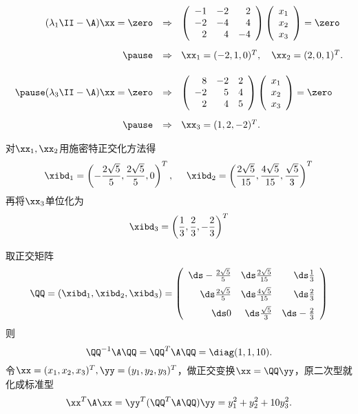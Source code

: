 \begin{frame}
  \begin{footnotesize}
    $$
    \begin{array}{rl}
      (\lambda_1\II-\A)\xx=\zero & \Rightarrow~~
      \left(
      \begin{array}{rrr}
        -1&-2&2\\
        -2&-4&4\\
        2&4&-4
      \end{array}
      \right)\left(
      \begin{array}{c}
        x_1\\
        x_2\\
        x_3
      \end{array}
      \right)=\zero\\[0.3in] \pause
      & \Rightarrow~~
      \xx_1=(-2,1,0)^T, \quad
      \xx_2=(2,0,1)^T. \\[0.2in]\pause
      (\lambda_3\II-\A)\xx=\zero & \Rightarrow~~
      \left(
      \begin{array}{rrr}
        8&-2&2\\
        -2&5&4\\
        2&4&5
      \end{array}
      \right)\left(
      \begin{array}{c}
        x_1\\
        x_2\\
        x_3
      \end{array}
      \right)=\zero\\[0.3in] \pause
      & \Rightarrow~~
      \xx_3=(1,2,-2)^T.
    \end{array}
    $$

    对$\xx_1,\xx_2$用施密特正交化方法得
    $$
    \xibd_1=\left(-\frac{2\sqrt{5}}5,\frac{2\sqrt{5}}5,0\right)^T,~~~~
    \xibd_2=\left(\frac{2\sqrt{5}}{15},\frac{4\sqrt{5}}{15},\frac{\sqrt{5}}3\right)^T
    $$
    再将$\xx_3$单位化为
    $$
    \xibd_3=\left(\frac13,\frac23,-\frac23\right)^T
    $$
  \end{footnotesize}
\end{frame}


\begin{frame}
  \begin{footnotesize}
    取正交矩阵
    $$
    \QQ=(\xibd_1,\xibd_2,\xibd_3)=\left(
    \begin{array}{rrr}
      \ds-\frac{2\sqrt{5}}5&\ds\frac{2\sqrt{5}}{15}&\ds\frac13\\[0.2cm]
      \ds \frac{2\sqrt{5}}5&\ds\frac{4\sqrt{5}}{15}&\ds\frac23\\[0.2cm]
      \ds 0&\ds\frac{\sqrt{5}}3&\ds-\frac23
    \end{array}
    \right)
    $$
    则
    $$
    \QQ^{-1}\A\QQ=\QQ^{T}\A\QQ=\diag(1,1,10).
    $$ \pause 
    令$\xx=(x_1,x_2,x_3)^T,\yy=(y_1,y_2,y_3)^T$，做正交变换$\xx=\QQ\yy$，原二次型就化成标准型
    $$
    \xx^T\A\xx=\yy^T(\QQ^T\A\QQ)\yy=y_1^2+y_2^2+10y_3^2.
    $$
  \end{footnotesize}
\end{frame}



